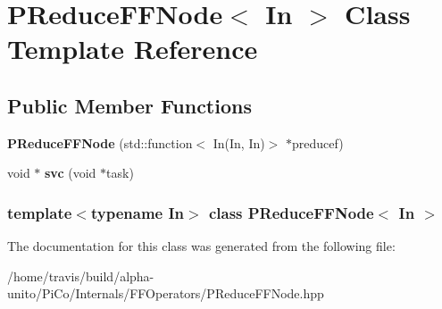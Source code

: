 \hypertarget{class_p_reduce_f_f_node}{\section{\-P\-Reduce\-F\-F\-Node$<$ \-In $>$ \-Class \-Template \-Reference}
\label{class_p_reduce_f_f_node}
}
\subsection*{\-Public \-Member \-Functions}
\begin{DoxyCompactItemize}
\item 
\hypertarget{class_p_reduce_f_f_node_a618f505f2a8eb4c8af71229016508356}{{\bfseries \-P\-Reduce\-F\-F\-Node} (std\-::function$<$ \-In(\-In, \-In)$>$ $\ast$preducef)}\label{class_p_reduce_f_f_node_a618f505f2a8eb4c8af71229016508356}

\item 
\hypertarget{class_p_reduce_f_f_node_a6f425a4f78632b76cec0e7658bcf8c3b}{void $\ast$ {\bfseries svc} (void $\ast$task)}\label{class_p_reduce_f_f_node_a6f425a4f78632b76cec0e7658bcf8c3b}

\end{DoxyCompactItemize}
\subsubsection*{template$<$typename \-In$>$ class P\-Reduce\-F\-F\-Node$<$ In $>$}



\-The documentation for this class was generated from the following file\-:\begin{DoxyCompactItemize}
\item 
/home/travis/build/alpha-\/unito/\-Pi\-Co/\-Internals/\-F\-F\-Operators/\-P\-Reduce\-F\-F\-Node.\-hpp\end{DoxyCompactItemize}
